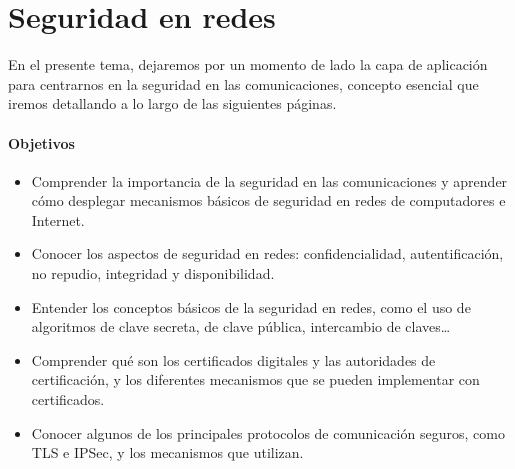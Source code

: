 \chapter{Seguridad en redes}

En el presente tema, dejaremos por un momento de lado la capa de aplicación para centrarnos en la seguridad en las comunicaciones, concepto esencial que iremos detallando a lo largo de las siguientes páginas.

\subsubsection{Objetivos}
\begin{itemize}
    \item Comprender la importancia de la seguridad en las comunicaciones y aprender cómo desplegar mecanismos básicos de seguridad en redes de computadores e Internet.
    \item Conocer los aspectos de seguridad en redes: confidencialidad, autentificación, no repudio, integridad y disponibilidad. 
    \item Entender los conceptos básicos de la seguridad en redes, como el uso de algoritmos de clave secreta, de clave pública, intercambio de claves\ldots
    \item Comprender qué son los certificados digitales y las autoridades de certificación, y los diferentes mecanismos que se pueden implementar con certificados. 
    \item Conocer algunos de los principales protocolos de comunicación seguros, como \acrshort{TLS} e \acrshort{IPSec}, y los mecanismos que utilizan. 
\end{itemize}


